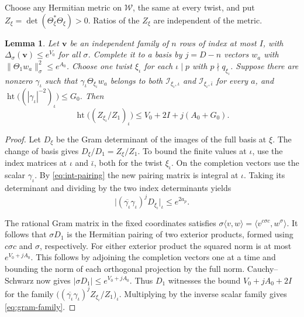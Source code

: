 \documentclass[11pt,reqno]{amsart}
\newtheorem{lemma}[theorem]{Lemma}
\theoremstyle{definition}
\numberwithin{equation}{section}
\newcommand{\htle}[2]{\operatorname{ht}\bigl(#1\bigr)\le #2}
\begin{document}
Choose any Hermitian metric on \(\mathcal W\), the same at
every twist, and put \(Z_\xi=\det(\Theta_\xi^*\Theta_\xi)>0\).
Ratios of the \(Z_\xi\) are independent of the metric.

\begin{lemma}\label{lem:gram}
Let \(\mathbf v\) be an independent family of \(n\) rows
of index at most \(I\), with \(\Delta_\sigma(\mathbf v)\le e^{V_0}\)
for all \(\sigma\). Complete it to a basis by \(j=D-n\)
vectors \(w_a\) with \(\|\Theta_1 w_a\|_\sigma^2\le e^{A_0}\).
Choose one twist \(\xi_\iota\) for each \(\iota\mid p\) with
\(p\nmid q_{\xi_\iota}\).
Suppose there are nonzero \(\gamma_\iota\) such that
\(\gamma_\iota\Theta_{\xi_\iota}w_a\) belongs to both
\(\mathcal I_{\xi_\iota,\iota}\) and
\(\mathcal I_{\xi_\iota,\bar\iota}\) for every \(a\), and
\(\htle{(|\gamma_\iota|^{-2})_\iota}{G_0}\). Then
\begin{equation}\label{eq:gram-family}
 \htle{(Z_{\xi_\iota}/Z_1)_\iota}{V_0+2I+j(A_0+G_0)}.
\end{equation}
\end{lemma}

\begin{proof}
Let \(D_\xi\) be the Gram determinant of the images of the
full basis at \(\xi\). The change of basis gives
\(D_\xi/D_1=Z_\xi/Z_1\). To bound the finite values at
\(\iota\), use the index matrices at \(\iota\) and
\(\bar\iota\), both for the twist \(\xi_\iota\).
On the completion vectors use the scalar \(\gamma_\iota\).
By \eqref{eq:int-pairing} the new pairing matrix is integral
at \(\iota\). Taking its determinant and dividing by the
two index determinants yields
\[
 \bigl|(\overline{\gamma_\iota}\gamma_\iota)^j
             D_{\xi_\iota}\bigr|_\iota\le e^{2a_p}.
\]

The rational Gram matrix in the fixed coordinates satisfies
\(\sigma\langle v,w\rangle=\langle v^{c\sigma c},w^\sigma\rangle\).
It follows that \(\sigma D_1\) is the Hermitian pairing of
two exterior products, formed using \(c\sigma c\) and
\(\sigma\), respectively. For either exterior product the
squared norm is at most \(e^{V_0+jA_0}\). This follows by
adjoining the completion vectors one at a time and bounding
the norm of each orthogonal projection by the full norm.
Cauchy--Schwarz now gives \(|\sigma D_1|\le e^{V_0+jA_0}\).
Thus \(D_1\) witnesses the bound \(V_0+jA_0+2I\) for the
family \(\bigl((\overline{\gamma_\iota}\gamma_\iota)^j
Z_{\xi_\iota}/Z_1\bigr)_\iota\).
Multiplying by the inverse scalar family gives
\eqref{eq:gram-family}.
\end{proof}
\end{document}
